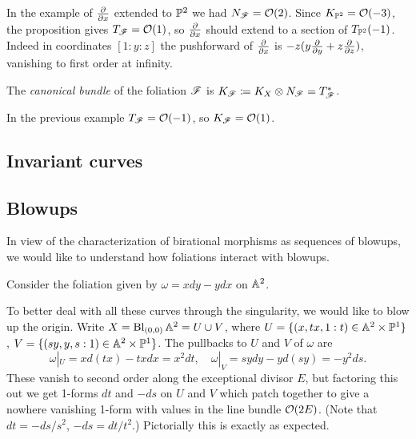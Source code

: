 \begin{example}
    In the example of $\pdv{}{x}$ extended to $\P^2$ we had $N_\scrF=\O(2)$.
    Since $K_{\P^2}=\O(-3)$, the proposition gives $T_\scrF=\O(1)$, so
    $\pdv{}{x}$ should extend to a section of $T_{\P^2}(-1)$. Indeed in
    coordinates $[1:y:z]$ the pushforward of $\pdv{}{x}$ is
    $-z(y\pdv{}{y}+z\pdv{}{z})$, vanishing to first order at infinity.
\end{example}

\begin{definition}
    The \emph{canonical bundle} of the foliation $\scrF$ is
    $K_\scrF\coloneqq K_X\otimes N_\scrF=T_\scrF^*$.
\end{definition}

\begin{example}
    In the previous example $T_\scrF=\O(-1)$, so $K_\scrF=\O(1)$.
\end{example}

\subsection{Invariant curves}



\subsection{Blowups}

In view of the characterization of birational morphisms as sequences of blowups,
we would like to understand how foliations interact with blowups.


\begin{example}
    Consider the foliation given by $\omega=xdy-ydx$ on $\A^2$. %

    To better deal with all these curves through the singularity, we would like
    to blow up the origin. Write $X=\Bl_{(0,0)}\A^2=U\cup V$, where
    $U=\{(x,tx,1:t)\in\A^2\times\P^1\}$, $V=\{(sy,y,s:1)\in\A^2\times\P^1\}$.
    The pullbacks to $U$ and $V$ of $\omega$ are
    \begin{equation*}
        \omega|_U = xd(tx)-txdx = x^2dt, \quad
        \omega|_V = sydy - yd(sy) = -y^2ds.
    \end{equation*}
    These vanish to second order along the exceptional divisor $E$, but
    factoring this out we get 1-forms $dt$ and $-ds$ on $U$ and $V$ which patch
    together to give a nowhere vanishing 1-form with values in the line bundle
    $\O(2E)$. (Note that $dt=-ds/s^2$, $-ds=dt/t^2$.) Pictorially this
    is exactly as expected. %
\end{example}

